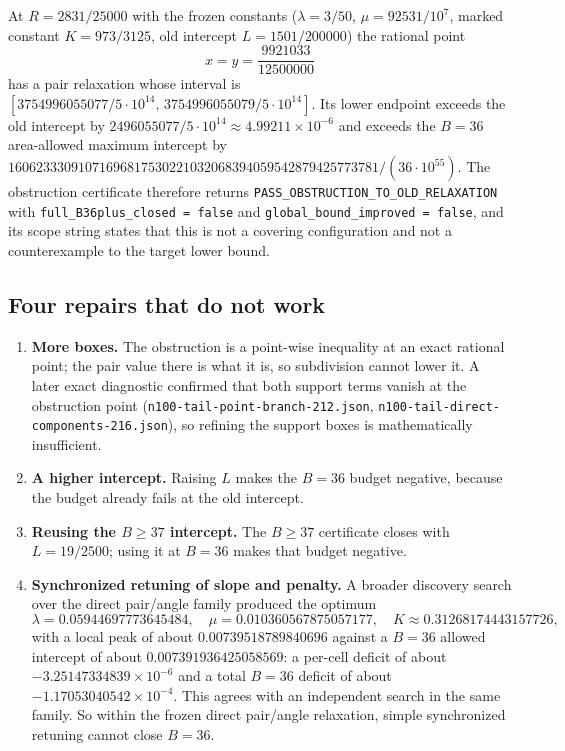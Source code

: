 At $R=2831/25000$ with the frozen constants ($\lambda=3/50$, $\mu=92531/10^{7}$, marked constant
$K=973/3125$, old intercept $L=1501/200000$) the rational point
\[
x=y=\frac{9921033}{12500000}
\]
has a pair relaxation whose interval is
$[3754996055077/5\cdot10^{14},\,3754996055079/5\cdot10^{14}]$. Its lower endpoint exceeds the old
intercept by $2496055077/5\cdot10^{14}\approx4.99211\times10^{-6}$ and exceeds the $B=36$
area-allowed maximum intercept by
$16062333091071696817530221032068394059542879425773781/(36\cdot10^{55})$. The obstruction certificate
therefore returns \texttt{PASS\_\allowbreak{}OBSTRUCTION\_\allowbreak{}TO\_\allowbreak{}OLD\_\allowbreak{}RELAXATION} with
\texttt{full\_\allowbreak{}B36plus\_\allowbreak{}closed = false} and \texttt{global\_\allowbreak{}bound\_\allowbreak{}improved = false}, and its scope
string states that this is not a covering configuration and not a counterexample to the target
lower bound.

\subsection{Four repairs that do not work}

\begin{enumerate}[leftmargin=1.6em,itemsep=3pt]
\item \textbf{More boxes.} The obstruction is a point-wise inequality at an exact rational point; the
pair value there is what it is, so subdivision cannot lower it. A later exact diagnostic confirmed
that both support terms vanish at the obstruction point
(\texttt{n100-\allowbreak{}tail-\allowbreak{}point-\allowbreak{}branch-\allowbreak{}212.json},
\texttt{n100-\allowbreak{}tail-\allowbreak{}direct-\allowbreak{}components-\allowbreak{}216.json}), so refining the support boxes is mathematically
insufficient.
\item \textbf{A higher intercept.} Raising $L$ makes the $B=36$ budget negative, because the budget
already fails at the old intercept.
\item \textbf{Reusing the $B\ge37$ intercept.} The $B\ge37$ certificate closes with $L=19/2500$; using
it at $B=36$ makes that budget negative.
\item \textbf{Synchronized retuning of slope and penalty.} A broader discovery search over the
direct pair/angle family produced the optimum
\[
\lambda=0.05944697773645484,\quad \mu=0.010360567875057177,\quad
K\approx0.31268174443157726,
\]
with a local peak of about $0.00739518789840696$ against a $B=36$ allowed intercept of about
$0.007391936425058569$: a per-cell deficit of about $-3.25147334839\times10^{-6}$ and a total $B=36$
deficit of about $-1.17053040542\times10^{-4}$. This agrees with an independent search in the same
family. So within the frozen direct pair/angle relaxation, simple synchronized retuning cannot close
$B=36$.
\end{enumerate}

